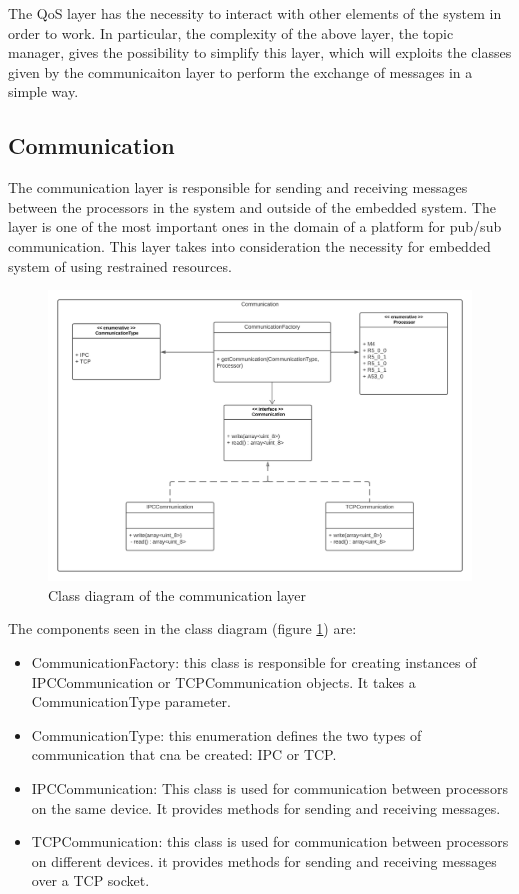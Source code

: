 The QoS layer has the necessity to interact with other elements of the system
in order to work. In particular, the complexity of the above layer, the topic
manager, gives the possibility to simplify this layer, which will exploits
the classes given by the communicaiton layer to perform the exchange of
messages in a simple way.

\subsection{Communication}

The communication layer is responsible for sending and receiving messages
between the processors in the system and outside of the embedded system.
The layer is one of the most important ones in the domain of a
platform for pub/sub communication. This layer takes into consideration the
necessity for embedded system of using restrained resources.

\begin{figure}[H]
    \centering
    \includegraphics[width=1.0\textwidth]{Figures/class_diagram_communication.png}
    \caption{Class diagram of the communication layer}
    \label{fig:class_diagram_communication}
\end{figure}

The components seen in the class diagram
(figure \ref{fig:class_diagram_communication}) are:

\begin{itemize}
    \item   CommunicationFactory: this class is responsible for creating
            instances of IPCCommunication or TCPCommunication objects. It takes
            a CommunicationType parameter.
    \item   CommunicationType: this enumeration defines the two types of
            communication that cna be created: IPC or TCP.
    \item   IPCCommunication: This class is used for communication between
            processors on the same device. It provides methods for sending and
            receiving messages.
    \item   TCPCommunication: this class is used for communication between
            processors on different devices. it provides methods for sending
            and receiving messages over a TCP socket.
\end{itemize}

